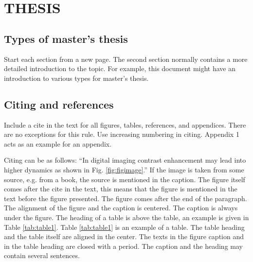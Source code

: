 \section{THESIS}\label{sec:thesis}

\subsection[TYPES OF MASTER'S THESIS]{Types of master's thesis}
\par Start each section from a new page. The second section normally contains a more detailed introduction to the topic. For example, this document might have an introduction to various types for master's thesis.

\subsection[CITING AND REFERENCES]{Citing and references}
\par{Include a cite in the text for all figures, tables, references, and appendices. There are no exceptions for this rule. Use increasing numbering in citing. Appendix 1 acts as an example for an appendix.}

\par{Citing can be as follows: ``In digital imaging contrast enhancement may lead into higher dynamics as shown in Fig. \ref{fig:figimage}.''  If the image is taken from some source, e.g. from a book, the source is mentioned in the caption.  The figure itself comes after the cite in the text, this means that the figure is mentioned in the text before the figure presented. The figure comes after the end of the paragraph. The alignment of the figure and the caption is centered. The caption is always under the figure. The heading of a table is above the table, an example is given in Table \ref{tab:table1}. Table \ref{tab:table1} is an example of a table. The table heading and the table itself are aligned in the center. The texts in the figure caption and in the table heading are closed with a period. The caption and the heading may contain several sentences.}

